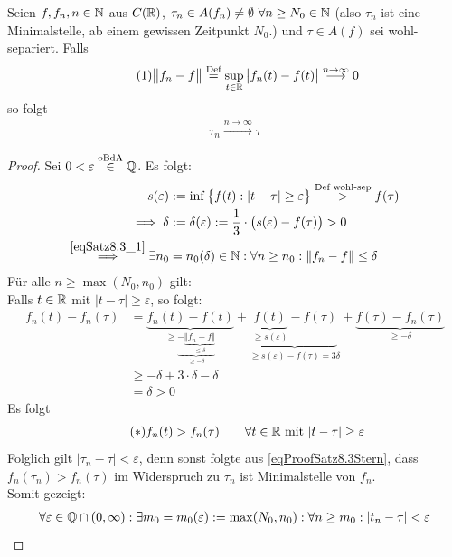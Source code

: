 \begin{satz}\label{satz8.3}
	Seien $f,f_n,n\in\mathbb{N}$ aus $C(\mathbb{R})$, $\tau_n\in A(f_n)\neq\emptyset~\forall n\geq N_0\in\mathbb{N}$ 
	(also $\tau_n$ ist eine Minimalstelle, ab einem gewissen Zeitpunkt $N_0$.)
	und $\tau\in A(f)$ sei wohl-separiert.
	Falls
	\begin{align}\label{eqSatz8.3_1}\tag{1}
		\big\Vert f_n-f\big\Vert\overset{\text{Def}}{=}\sup\limits_{t\in\mathbb{R}}\big|f_n(t)-f(t)\big|\overset{n\to\infty}{\longrightarrow}0
	\end{align}
	so folgt
	\begin{align*}
		\tau_n\overset{n\to\infty}{\longrightarrow}\tau
	\end{align*}
\end{satz}

\begin{proof}
	Sei $0<\varepsilon\overset{\text{oBdA}}{\in}\mathbb{Q}$. Es folgt:
	\begin{align*}
		s(\varepsilon)&:=\inf\limits\big\lbrace f(t):|t-\tau|\geq\varepsilon\big\rbrace
		\overset{\text{Def wohl-sep}}{>}
		f(\tau)\\
		\implies
		\delta&:=\delta(\varepsilon):=\frac{1}{3}\cdot\big(s(\varepsilon)-f(\tau)\big)>0\\
		\overset{\eqref{eqSatz8.3_1}}{\implies}
		\exists n_0&=n_0(\delta)\in\mathbb{N}:\forall n\geq n_0:
		\Vert f_n-f\Vert\leq\delta
	\end{align*}
	Für alle $n\geq\max\limits(N_0,n_0)$ gilt:\\
	Falls $t\in\mathbb{R}$ mit $|t-\tau|\geq\varepsilon$, so folgt:
	\begin{align*}
		f_n(t)-f_n(\tau)
		&=\underbrace{f_n(t)-f(t)}_{\geq\underbrace{-\underbrace{\Vert f_n-f\Vert}_{\leq\delta}}_{\geq-\delta}}+\underbrace{\underbrace{f(t)}_{\geq s(\varepsilon)}-f(\tau)}_{\geq s(\varepsilon)-f(\tau)=3\delta}+\underbrace{f(\tau)-f_n(\tau)}_{\geq-\delta}\\
		&\geq-\delta+3\cdot\delta-\delta\\
		&=\delta>0
	\end{align*}
	Es folgt
	\begin{align}\label{eqProofSatz8.3Stern}\tag{$\ast$}
		f_n(t)>f_n(\tau)\qquad\forall t\in\mathbb{R}\text{ mit }|t-\tau|\geq\varepsilon
	\end{align}
	Folglich gilt $|\tau_n-\tau|<\varepsilon$, denn sonst folgte aus \eqref{eqProofSatz8.3Stern}, dass
	$f_n(\tau_n)>f_n(\tau)$ im Widerspruch zu $\tau_n$ ist Minimalstelle von $f_n$.\\
	Somit gezeigt:
	\begin{align*}
		\forall\varepsilon\in\mathbb{Q}\cap(0,\infty):\exists m_0=m_0(\varepsilon):=\max\limits(N_0,n_0):\forall n\geq m_0:|t_n-\tau|<\varepsilon
	\end{align*}
\end{proof}

